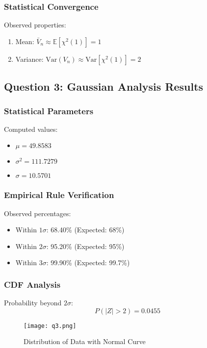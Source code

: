 \documentclass[12pt]{article}
\begin{document}
\subsubsection{Statistical Convergence}
Observed properties:
\begin{enumerate}
    \item Mean: $\bar{V}_n \approx \mathbb{E}[\chi^2(1)] = 1$
    \item Variance: $\text{Var}(V_n) \approx \text{Var}[\chi^2(1)] = 2$
\end{enumerate}

\subsection{Question 3: Gaussian Analysis Results}
\subsubsection{Statistical Parameters}
Computed values:
\begin{itemize}
    \item $\mu = 49.8583$
    \item $\sigma^2 = 111.7279$
    \item $\sigma = 10.5701$
\end{itemize}

\subsubsection{Empirical Rule Verification}
Observed percentages:
\begin{itemize}
    \item Within $1\sigma$: 68.40\% (Expected: 68\%)
    \item Within $2\sigma$: 95.20\% (Expected: 95\%)
    \item Within $3\sigma$: 99.90\% (Expected: 99.7\%)
\end{itemize}

\subsubsection{CDF Analysis}
Probability beyond $2\sigma$:
\begin{equation}
    P(|Z| > 2) = 0.0455
\end{equation}
\begin{figure}[H]
    \centering
    \texttt{[image: q3.png]}
    \caption{Distribution of Data with Normal Curve}
    \label{fig:enter-label}
\end{figure}
\end{document}

